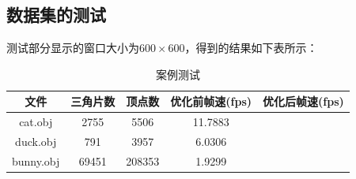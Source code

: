 \documentclass[10pt]{article}
\begin{document}
\subsection{数据集的测试}
测试部分显示的窗口大小为$600\times600$，得到的结果如下表所示：
\begin{table}[H]
\caption{案例测试}
\begin{center}
\begin{tabular}{ccccc}
\toprule  %
文件&三角片数&顶点数&优化前帧速(fps)&优化后帧速(fps)\\
\midrule  %
cat.obj&2755&5506&11.7883& \\
duck.obj&791&3957& 6.0306&\\
bunny.obj&69451&208353&1.9299&\\
\bottomrule %
\end{tabular}
\end{center}
\end{table}
\end{document}

